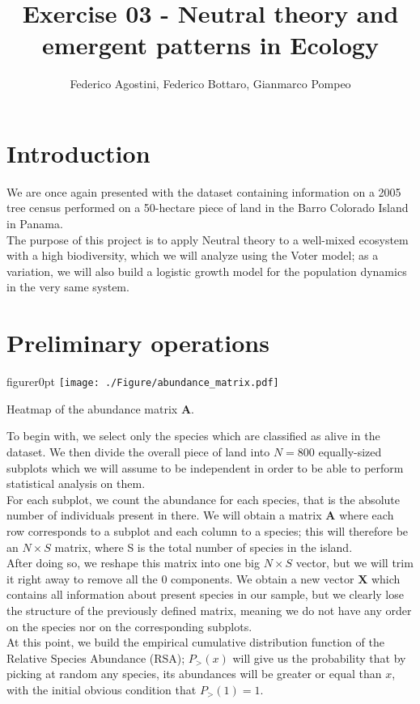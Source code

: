 \documentclass[a4paper,11pt]{article}
\title{Exercise 03 - Neutral theory and emergent patterns in Ecology}
\author{Federico Agostini, Federico Bottaro, Gianmarco Pompeo}
\date{}
\begin{document}
\maketitle


\section{Introduction}
We are once again presented with the dataset containing information on a 2005 tree census performed on a 50-hectare piece of land in the Barro Colorado Island in Panama.
\\
The purpose of this project is to apply Neutral theory to a well-mixed ecosystem with a high biodiversity, which we will analyze using the Voter model; as a variation, we will also build a logistic growth model for the population dynamics in the very same system.

\section{Preliminary operations}
\begin{wrapfloat}{figure}{r}{0pt}
        \texttt{[image: ./Figure/abundance\_matrix.pdf]}
        \centering
    \caption{Heatmap of the abundance matrix \textbf{A}.}
    \label{fig:ME1_lambda_hist}
\end{wrapfloat}
To begin with, we select only the species which are classified as alive in the dataset. We then divide the overall piece of land into $N=800$ equally-sized subplots which we will assume to be independent in order to be able to perform statistical analysis on them.
\\
For each subplot, we count the abundance for each species, that is the absolute number of individuals present in there. We will obtain a matrix $\mathbf{A}$ where each row corresponds to a subplot and each column to a species; this will therefore be an $N \times S$ matrix, where S is the total number of species in the island.
\\
After doing so, we reshape this matrix into one big $N \times S$ vector, but we will trim it right away to remove all the 0 components. We obtain a new vector $\mathbf{X}$ which contains all information about present species in our sample, but we clearly lose the structure of the previously defined matrix, meaning we do not have any order on the species nor on the corresponding subplots.
\\
At this point, we build the empirical cumulative distribution function of the Relative Species Abundance (RSA); $P_>(x)$ will give us the probability that by picking at random any species, its abundances will be greater or equal than $x$, with the initial obvious condition that $P_>(1)=1$.
\end{document}
